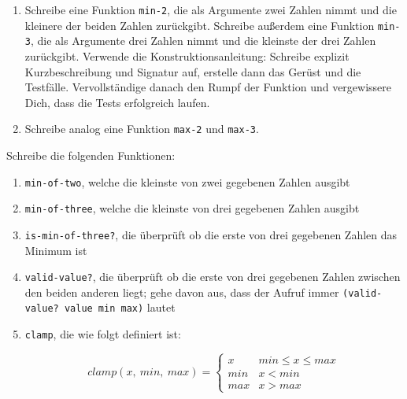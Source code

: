 \begin{aufgabe}

  \begin{enumerate}

  \item Schreibe eine Funktion \texttt{min-2}, die als Argumente zwei
    Zahlen nimmt und die kleinere der beiden Zahlen zurückgibt.  Schreibe
    außerdem eine Funktion \texttt{min-3}, die als Argumente drei
    Zahlen nimmt und die kleinste der drei Zahlen zurückgibt.  Verwende
    die Konstruktionsanleitung: Schreibe
    explizit Kurzbeschreibung und Signatur auf, erstelle dann das
    Gerüst und die Testfälle.  Vervollständige danach den Rumpf der
    Funktion und vergewissere Dich, dass die Tests erfolgreich laufen.
    
  \item Schreibe analog eine Funktion \texttt{max-2} und \texttt{max-3}.
    
  \end{enumerate}
\end{aufgabe}

\begin{aufgabe}
  Schreibe die folgenden Funktionen:
  \begin{enumerate}
  \item \texttt{min-of-two}, welche die kleinste von zwei
    gegebenen Zahlen ausgibt
  \item \texttt{min-of-three}, welche die kleinste von drei
    gegebenen Zahlen ausgibt
  \item \texttt{is-min-of-three?}, die überprüft ob die erste
    von drei gegebenen Zahlen das Minimum ist
  \item \texttt{valid-value?}, die überprüft ob die erste von
    drei gegebenen Zahlen zwischen den beiden anderen liegt; gehe
    davon aus, dass der Aufruf immer \texttt{(valid-value? value min max)}
    lautet 
  \item \texttt{clamp}, die wie folgt definiert ist:
    
    \[\mathit{clamp}(x,\ \mathit{min},\ \mathit{max})=
    \begin{cases} 
      x & \mathit{min} \leq x \leq \mathit{max}\\ 
      \mathit{min} & x < \mathit{min} \\ 
      \mathit{max} & x > \mathit{max}
    \end{cases}
    \]
    
  \end{enumerate}
\end{aufgabe}

